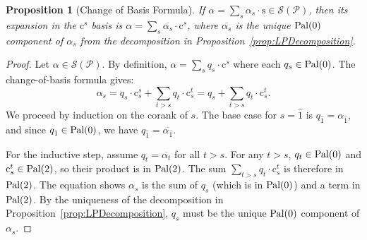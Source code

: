 \documentclass[11pt, letterpaper, english]{amsart}
\theoremstyle{teoremas}
\newtheorem{proposition}[theorem]{Proposition}
\theoremstyle{definition}
\newcommand{\calP}{\mathcal{P}}
\newcommand{\Ebasis}[1]{\mathrm{#1}}
\newcommand{\Cbasis}[1]{\mathrm{c}^{#1}}
\newcommand{\CbasisSub}[2]{\mathrm{c}^{#1}_{#2}}
\newcommand{\pal}{\normalfont\text{Pal}}
\begin{document}
\begin{proposition}[Change of Basis Formula]\label{prop:changeofbasis}
    If \(\alpha = \sum_s \alpha_s \cdot\Ebasis{s} \in \mathcal{S}(\calP)\),
    then its expansion in the \(\Cbasis{s}\) basis is
    \(\alpha = \sum_s \overline{\alpha_s} \cdot\Cbasis{s}\), where \(\overline{\alpha_s}\) is the unique \(\pal(0)\) component of \(\alpha_s\) from the decomposition in Proposition~\ref{prop:LPDecomposition}.
\end{proposition}
\begin{proof}
    Let \(\alpha \in \mathcal{S}(\calP)\). By definition, \(\alpha = \sum_s q_s \cdot \Cbasis{s}\) where each \(q_s \in \pal(0)\). The change-of-basis formula gives:
    \[ \alpha_s = q_s \cdot \CbasisSub{s}{s} + \sum_{t > s} q_t \cdot \CbasisSub{t}{s} = q_s + \sum_{t > s} q_t \cdot \CbasisSub{t}{s}. \]
    We proceed by induction on the corank of \(s\). The base case for \(s=\hat{1}\) is \(q_{\hat{1}} = \alpha_{\hat{1}}\), and since \(q_{\hat{1}} \in \pal(0)\), we have \(q_{\hat{1}} = \overline{\alpha_{\hat{1}}}\).

    For the inductive step, assume \(q_t = \overline{\alpha_t}\) for all \(t>s\). For any \(t>s\), \(q_t \in \pal(0)\) and \(\CbasisSub{t}{s} \in \pal(2)\), so their product is in \(\pal(2)\). The sum \(\sum_{t > s} q_t \cdot \CbasisSub{t}{s}\) is therefore in \(\pal(2)\).
    The equation shows \(\alpha_s\) is the sum of \(q_s\) (which is in \(\pal(0)\)) and a term in \(\pal(2)\). By the uniqueness of the decomposition in Proposition~\ref{prop:LPDecomposition}, \(q_s\) must be the unique \(\pal(0)\) component of \(\alpha_s\).
\end{proof}



\end{document}
